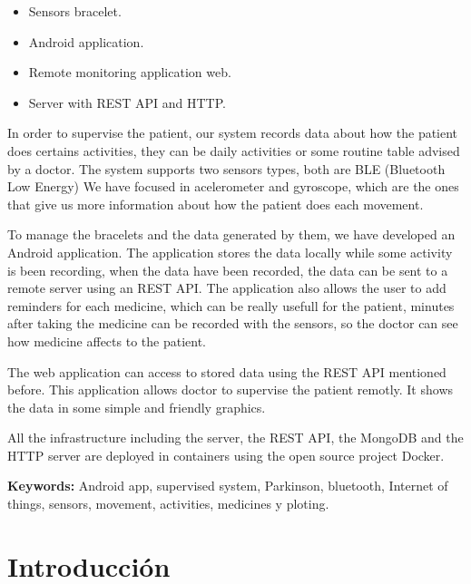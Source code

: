 \documentclass[11pt,spanish]{article}
\newcommand\blankpage{%
    \null
    \thispagestyle{empty}%
    \addtocounter{page}{-1}%
    \newpage}
\begin{document}
\begin{itemize}
	\item Sensors bracelet.
    \item Android application.
    \item Remote monitoring application web.
    \item Server with REST API and HTTP.
\end{itemize}

In order to supervise the patient, our system records data about how the patient does certains activities, they can be daily activities or some routine table advised by a doctor. The system supports two sensors types, both are BLE (Bluetooth Low Energy) We have focused in acelerometer and gyroscope, which are the ones that give us more information about how the patient does each movement.
\newline

To manage the bracelets and the data generated by them, we have developed an Android application. The application stores the data locally while some activity is been recording, when the data have been recorded, the data can be sent to a remote server using an REST API. The application also allows the user to add reminders for each medicine, which can be really usefull for the patient, minutes after taking the medicine can be recorded with the sensors, so the doctor can see how medicine affects to the patient.
\newline

The web application can access to stored data using the REST API mentioned before. This application allows doctor to supervise the patient remotly. It shows the data in some simple and friendly graphics.
\newline

All the infrastructure including the server, the REST API, the MongoDB and the HTTP server are deployed in containers using the open source project Docker.
\newline

{\bf Keywords:} Android app, supervised system, Parkinson, bluetooth, Internet of things, sensors, movement, activities, medicines y ploting.

\newpage
\blankpage


\newpage
\tableofcontents
\newpage
\listoffigures
\newpage
\section{Introducción}
\end{document}
